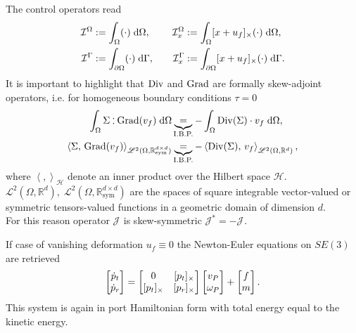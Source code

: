  The control operators read
\begin{equation*}
\begin{aligned}
\mathcal{I}^\Omega &:=\int_{\Omega} (\cdot) \d{\Omega}, \\
\mathcal{I}^\Gamma &:= \int_{\partial \Omega} (\cdot) \d{\Gamma}, \\
\end{aligned} \qquad
\begin{aligned} 
\mathcal{I}_{x}^\Omega &:=\int_{\Omega} \crmat{x+u_f} (\cdot) \d{\Omega}, \\
\mathcal{I}_{x}^\Gamma &:=\int_{\partial \Omega} \crmat{x+u_f} (\cdot) \d{\Gamma}. \\
\end{aligned}
\end{equation*}
It is important to highlight that $\operatorname*{Div}$ and $\operatorname*{Grad}$ are formally skew-adjoint operators, i.e. for homogeneous boundary conditions $\tau= 0$
\begin{align*}
\int_{\Omega} \Sigma \cddot \Grad(v_f) \d{\Omega} &\underbrace{=}_{\text{I.B.P.}} -\int_{\Omega} \Div(\Sigma) \cdot v_f \d{\Omega}, \\
\left\langle \Sigma, \, \Grad(v_f) \right\rangle_{\mathscr{L}^2(\Omega, \mathbb{R}^{d\times d}_{\text{sym}})} &\underbrace{=}_{\text{I.B.P.}} -\left\langle\Div(\Sigma), \, v_f \right\rangle_{\mathscr{L}^2(\Omega, \mathbb{R}^d)}, 
\end{align*}
where $\left\langle ,  \right\rangle_\mathscr{H}$ denote an inner product over the Hilbert space $\mathscr{H}$. \\
$\mathscr{L}^2(\Omega, \mathbb{R}^d), \; \mathscr{L}^2(\Omega, \mathbb{R}^{d\times d}_{\text{sym}})$ are the spaces of square integrable vector-valued or symmetric tensors-valued functions in a geometric domain of dimension $d$. \\
For this reason operator $\mathcal{J}_{}$ is skew-symmetric $\mathcal{J}_{}^* = - \mathcal{J}_{}$.

\begin{remark}
If case of vanishing deformation $u_f \equiv 0$ the Newton-Euler equations on $SE(3)$ are retrieved
\begin{equation}
\begin{bmatrix}
\dot{p}_t \\ \dot{p}_r \\
\end{bmatrix} = 
\begin{bmatrix}
	0 & \crmat{p_t}\\
	\crmat{p_t} & \crmat{p_r} \\
	\end{bmatrix}
\begin{bmatrix}
v_P \\ \omega_P  \\
\end{bmatrix} + 
\begin{bmatrix}
f \\ m \\
\end{bmatrix}.
\end{equation}
This system is again in port Hamiltonian form with total energy equal to the kinetic energy.
\end{remark}
